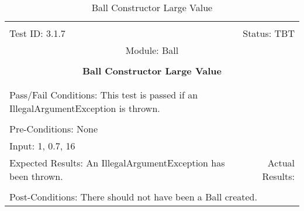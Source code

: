 \documentclass[titlepage]{article}
\begin{document}
\begin{center}%
\begin{table}
\begin{tabular}{|l r|}\hline&\\[-2mm]
	Test ID: 3.1.7	&Status: TBT\\[-3mm]
	\multicolumn{2}{|c|}{Module: Ball}\\&\\
	\multicolumn{2}{|c|}{\textbf{\large{Ball Constructor Large Value}}}\\&\\\hline&\\[-3mm]
	\multicolumn{2}{|p{\textwidth}|}{Pass/Fail Conditions: This test is passed if an IllegalArgumentException is thrown.}\\[1mm]\hline&\\[-3mm]
	\multicolumn{2}{|p{\textwidth}|}{Pre-Conditions: None}\\[4mm]
	\multicolumn{2}{|p{\textwidth}|}{Input: 1, 0.7, 16}\\[2mm]\hline
	\multicolumn{1}{|p{0.49\textwidth}}{Expected Results: An IllegalArgumentException has been thrown.}	&\multicolumn{1}{|p{0.45\textwidth}|}{Actual Results:}\\\hline&\\[-3mm]
	\multicolumn{2}{|p{\textwidth}|}{Post-Conditions: There should not have been a Ball created.}\\\hline
\end{tabular}
\caption{Ball Constructor Large Value}
\end{table}
\end{center}
\end{document}
